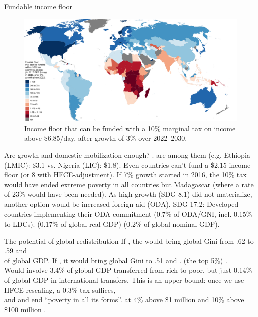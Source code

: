\documentclass[aspectratio=169,xcolor=dvipsnames, 11pt,mathserif]{beamer}
\begin{document}
\begin{frame}{Fundable income floor}    
    \begin{figure}
      \caption{Income floor that can be funded with a 10\% marginal tax on income above \$6.85/day, after growth of 3\% over 2022--2030. 
      }
      \includegraphics[height=.85\textheight]{../figures/demogrant_7__10.pdf}
    \end{figure}
\end{frame}

\begin{frame}{Are growth and domestic mobilization enough?}   
    \bbsp 
    \ip {}.
    \ip {} are among them (e.g. Ethiopia (LMIC): \$3.1 vs. Nigeria (LIC): \$1.8).
    \ip Even  countries can't fund a \$2.15 income floor (or 8 with HFCE-adjustment).
    \ip If 7\% growth started in 2016, the 10\% tax would have ended extreme poverty in all countries but Madagascar (where a rate of 23\% would have been needed).
    \ip As high growth (SDG 8.1) did not materialize, another option would be increased foreign aid (ODA).
    \ip SDG 17.2: Developed countries implementing their ODA commitment (0.7\% of ODA/GNI, incl. 0.15\% to LDCs).
    \ip {} (0.17\% of global real GDP)  (0.2\% of global nominal GDP).
    \ee 
\end{frame}

\begin{frame}{The potential of global redistribution}
    \bbsp \ip If , the  would bring global Gini from .62 to .59 and \\  of global GDP.
    \ip If , it would bring global Gini to .51 and .
    \ip {} (the top 5\%) . \\ Would involve 3.4\% of global GDP transferred from rich to poor, but just 0.14\% of global GDP in international transfers.
    \ip This is an upper bound: once we use HFCE-rescaling, a 0.3\% tax suffices, \\ and  and end ``poverty in all its forms''.
    \ip {} at 4\% above \$1 million and 10\% above \$100 million .
    \ee
\end{frame}
\end{document}
